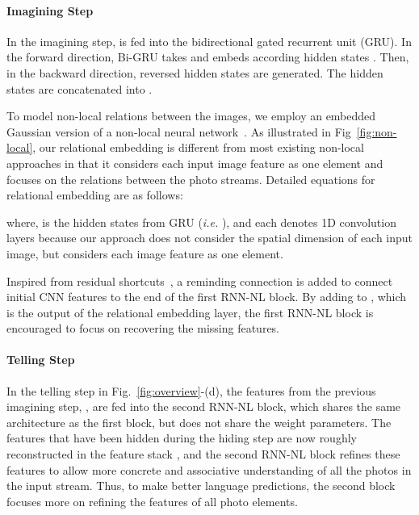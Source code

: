 \documentclass[letterpaper]{article} \usepackage{aaai20}  \usepackage{times}  \usepackage{helvet} \usepackage{courier}  \usepackage[hyphens]{url}  \usepackage{graphicx} \urlstyle{rm} \def\UrlFont{\rm}  \usepackage{graphicx}  \frenchspacing  \setlength{\pdfpagewidth}{8.5in}  \setlength{\pdfpageheight}{11in}
\newcommand{\figfref}[1]{Fig~\ref{#1}}
\newcommand{\figref}[1]{Fig.~\ref{#1}}
\newcommand{\ie}{{\it i.e. }}
\begin{document}
\paragraph{Imagining Step}
\quad

\noindent
In the imagining step,  is fed into the bidirectional gated recurrent unit (GRU). In the forward direction, Bi-GRU takes  and embeds according hidden states . Then, in the backward direction, reversed hidden states  are generated. The hidden states are concatenated into .

To model non-local relations between the images, we employ an embedded Gaussian version of a non-local neural network~\cite{vaswani2017attention,wang2018non}. As illustrated in \figfref{fig:non-local}, our relational embedding is different from most existing non-local approaches in that it considers each input image feature as one element and focuses on the relations between the photo streams. Detailed equations for relational embedding are as follows:


where,  is the hidden states from GRU (\ie ), and each  denotes 1D convolution layers because our approach does not consider the spatial dimension of each input image, but considers each image feature as one element.


Inspired from residual shortcuts~\cite{he2016deep}, a reminding connection is added to connect initial CNN features to the end of the first RNN-NL block. By adding  to , which is the output of the relational embedding layer, the first RNN-NL block is encouraged to focus on recovering the missing features.




\paragraph{Telling Step}
\quad

\noindent
In the telling step in \figref{fig:overview}-(d), the features from the previous imagining step, , are fed into the second RNN-NL block, which shares the same architecture as the first block, but does not share the weight parameters. The features that have been hidden during the hiding step are now roughly reconstructed in the feature stack , and the second RNN-NL block refines these features to allow more concrete and associative understanding of all the photos in the input stream. Thus, to make better language predictions, the second block focuses more on refining the features of all photo elements.
\end{document}
